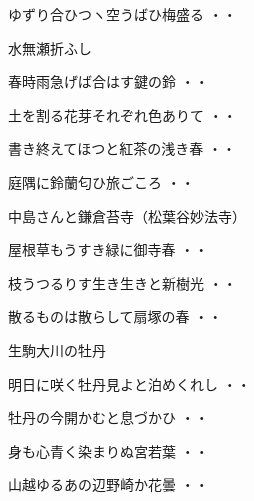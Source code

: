\begin{shiika}ゆずり合ひつヽ空うばひ梅盛る
\hfill{・・}\end{shiika}
\vspace{0.6cm}
水無瀬折ふし
\begin{shiika}春時雨急げば合はす鍵の鈴
\hfill{・・}\end{shiika}
\begin{shiika}土を割る花芽それぞれ色ありて
\hfill{・・}\end{shiika}
\begin{shiika}書き終えてほつと紅茶の浅き春
\hfill{・・}\end{shiika}
\begin{shiika}庭隅に鈴蘭匂ひ旅ごころ
\hfill{・・}\end{shiika}
\vspace{0.6cm}
中島さんと鎌倉苔寺（松葉谷妙法寺）
\begin{shiika}屋根草もうすき緑に御寺春
\hfill{・・}\end{shiika}
\vspace{0.6cm}
\begin{shiika}枝うつるりす生き生きと新樹光
\hfill{・・}\end{shiika}
\vspace{0.6cm}
\begin{shiika}散るものは散らして扇塚の春
\hfill{・・}\end{shiika}
\vspace{0.6cm}
生駒大川の牡丹
\begin{shiika}明日に咲く牡丹見よと泊めくれし
\hfill{・・}\end{shiika}
\begin{shiika}牡丹の今開かむと息づかひ
\hfill{・・}\end{shiika}
\vspace{0.6cm}
\begin{shiika}身も心青く染まりぬ宮若葉
\hfill{・・}\end{shiika}
\begin{shiika}山越ゆるあの辺野崎か花曇
\hfill{・・}\end{shiika}
\vspace{0.6cm}
